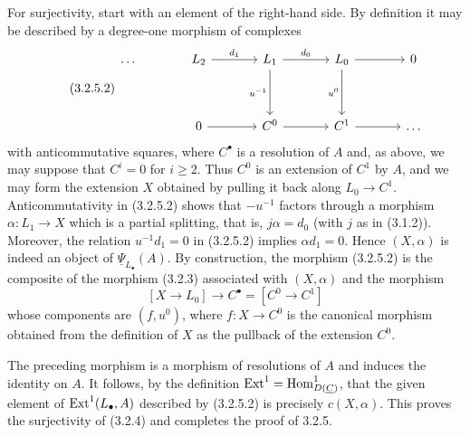 For surjectivity, start with an element of the right-hand side. By
definition it may be described by a degree-one morphism of complexes
\begin{equation}\tag{3.2.5.2}
\begin{tikzcd}[column sep=large,row sep=huge]
 \ldots & L_2\arrow[r,"d_1"]
 & L_1\arrow[r,"d_0"]\arrow[d,"u^{-1}"']
 & L_0\arrow[r]\arrow[d,"u^0"'] & 0\\
 & 0\arrow[r] & C^0\arrow[r] & C^1\arrow[r] & \ldots
\end{tikzcd}
\end{equation}
with anticommutative squares, where $C^\bullet$ is a resolution of
$A$ and, as above, we may suppose that $C^i=0$ for $i\geq2$. Thus
$C^0$ is an extension of $C^1$ by $A$, and we may form the extension
$X$ obtained by pulling it back along $L_0\longrightarrow C^1$.
Anticommutativity in (3.2.5.2) shows that $-u^{-1}$ factors through a
morphism $\alpha:L_1\longrightarrow X$ which is a partial splitting,
that is, $j\alpha=d_0$ (with $j$ as in (3.1.2)). Moreover, the
relation $u^{-1}d_1=0$ in (3.2.5.2) implies
$\alpha d_1=0$. Hence $(X,\alpha)$ is indeed an object of
$\underline\Psi_{L_\bullet}(A)$. By construction, the morphism
(3.2.5.2) is the composite of the morphism (3.2.3) associated with
$(X,\alpha)$ and the morphism
\[
 [X\longrightarrow L_0]\longrightarrow C^\bullet
 =[C^0\longrightarrow C^1]
\]
whose components are $(f,u^0)$, where $f:X\longrightarrow C^0$ is
the canonical morphism obtained from the definition of $X$ as the
pullback of the extension $C^0$.

The preceding morphism is a morphism of resolutions of $A$ and
induces the identity on $A$. It follows, by the definition
$\Ext^1=\Hom^1_{D(\underline C)}$, that the given element of
$\operatorname{Ext}^1(L_\bullet,A)$ described by (3.2.5.2) is precisely
$c(X,\alpha)$. This proves the surjectivity of (3.2.4) and completes
the proof of 3.2.5.

